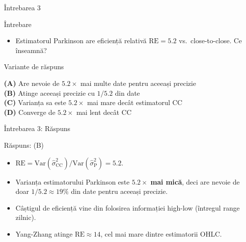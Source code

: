 \documentclass[9pt, aspectratio=169, t]{beamer}
\theoremstyle{definition}
\newenvironment{cminipage}[1]{%
    \par\noindent\hfill\begin{minipage}{#1}\ignorespaces
}{%
    \end{minipage}\hfill\null\par
}
\newcommand{\Var}{\text{Var}}
\begin{document}
\begin{frame}{Întrebarea 3}
    \begin{cminipage}{0.95\textwidth}
    \begin{alertblock}{Întrebare}
        \begin{itemize}
            \item Estimatorul Parkinson are eficiență relativă $\text{RE} = 5.2$ vs.\ close-to-close. Ce înseamnă?
        \end{itemize}
    \end{alertblock}

    \vspace{0.3cm}

    \begin{block}{Variante de răspuns}

        \textcolor{MainBlue}{\textbf{(A)}} Are nevoie de $5.2\times$ mai multe date pentru aceeași precizie\\[3pt]

        \textcolor{MainBlue}{\textbf{(B)}} Atinge aceeași precizie cu $1/5.2$ din date\\[3pt]

        \textcolor{MainBlue}{\textbf{(C)}} Varianța sa este $5.2\times$ mai mare decât estimatorul CC\\[3pt]

        \textcolor{MainBlue}{\textbf{(D)}} Converge de $5.2\times$ mai lent decât CC

    \end{block}
    \end{cminipage}
\end{frame}

\begin{frame}{Întrebarea 3: Răspuns}
    \begin{cminipage}{0.95\textwidth}
    \begin{exampleblock}{Răspuns: (B)}
    \begin{itemize}
        \item $\text{RE} = \Var(\hat\sigma^2_{\text{CC}}) / \Var(\hat\sigma^2_{\text{P}}) = 5.2$.
        \item Varianța estimatorului Parkinson este $5.2\times$ \textbf{mai mică}, deci are nevoie de doar $1/5.2 \approx 19\%$ din date pentru aceeași precizie.
        \item Câștigul de eficiență vine din folosirea informației high-low (întregul range zilnic).
        \item Yang-Zhang atinge $\text{RE} \approx 14$, cel mai mare dintre estimatorii OHLC.
    \end{itemize}
    \end{exampleblock}
    \end{cminipage}
\end{frame}
\end{document}
